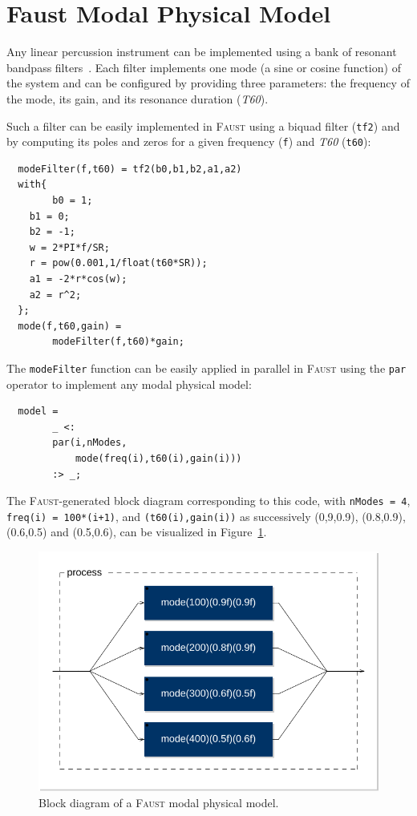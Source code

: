 \documentclass[11pt,a4paper]{article}
\newcommand{\f}{\textsc{Faust}}
\begin{document}
\section{Faust Modal Physical Model}
\label{sec:model}

Any linear percussion instrument can be implemented using a bank of resonant bandpass filters~\cite{Smith2010}. Each filter implements one mode (a sine or cosine function) of the system and can be configured by providing three parameters: the frequency of the mode, its gain, and its resonance duration (\textit{T60}).

Such a filter can be easily implemented in \f{} using a biquad filter (\texttt{tf2}) and by computing its poles and zeros for a given frequency (\texttt{f}) and \textit{T60} (\texttt{t60}):

\begin{lstlisting}
  modeFilter(f,t60) = tf2(b0,b1,b2,a1,a2)
  with{
        b0 = 1;
	b1 = 0;
	b2 = -1;
	w = 2*PI*f/SR;
	r = pow(0.001,1/float(t60*SR));
	a1 = -2*r*cos(w);
	a2 = r^2;
  };
  mode(f,t60,gain) = 
        modeFilter(f,t60)*gain;
\end{lstlisting}

The \texttt{modeFilter} function can be easily applied in parallel in \f{} using the \texttt{par} operator to implement any modal physical model:

\begin{lstlisting}
  model = 
        _ <: 
        par(i,nModes,
            mode(freq(i),t60(i),gain(i)))
        :> _;
\end{lstlisting}

The \f{}-generated block diagram corresponding to this code, with \lstinline{nModes = 4}, \lstinline{freq(i) = 100*(i+1)}, and \lstinline{(t60(i),gain(i))} as successively (0,9,0.9), (0.8,0.9), (0.6,0.5) and (0.5,0.6), can be visualized in Figure~\ref{fig:modalModel}.

\begin{figure}[htbp]
 	\centering \includegraphics[width=\columnwidth]{pictures/modalModel}
	\caption{Block diagram of a \f{} modal physical model.}
	\label{fig:modalModel}
\end{figure}
\end{document}
